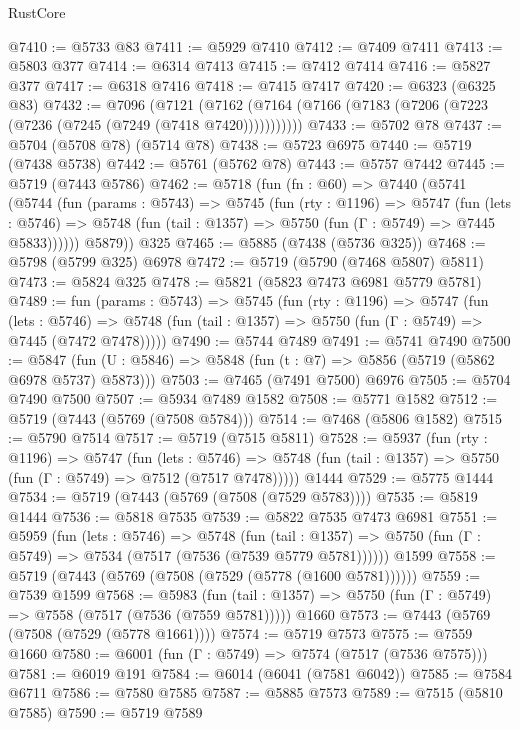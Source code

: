 \begin{lexlean}{RustCore}
\begin{coremodule}
@7410 := @5733 @83
@7411 := @5929 @7410
@7412 := @7409 @7411
@7413 := @5803 @377
@7414 := @6314 @7413
@7415 := @7412 @7414
@7416 := @5827 @377
@7417 := @6318 @7416
@7418 := @7415 @7417
@7420 := @6323 (@6325 @83)
@7432 := @7096
    (@7121 (@7162 (@7164 (@7166 (@7183 (@7206 (@7223 (@7236 (@7245 (@7249 (@7418 @7420)))))))))))
@7433 := @5702 @78
@7437 := @5704 (@5708 @78) (@5714 @78)
@7438 := @5723 @6975
@7440 := @5719 (@7438 @5738)
@7442 := @5761 (@5762 @78)
@7443 := @5757 @7442
@7445 := @5719 (@7443 @5786)
@7462 := @5718
    (fun (fn : @60) =>
    @7440
      (@5741
        (@5744
          (fun (params : @5743) =>
          @5745
            (fun (rty : @1196) =>
            @5747
              (fun (lets : @5746) =>
              @5748 (fun (tail : @1357) => @5750 (fun (Γ : @5749) => @7445 @5833))))))
        @5879))
    @325
@7465 := @5885 (@7438 (@5736 @325))
@7468 := @5798 (@5799 @325) @6978
@7472 := @5719 (@5790 (@7468 @5807) @5811)
@7473 := @5824 @325
@7478 := @5821 (@5823 @7473 @6981 @5779 @5781)
@7489 := fun (params : @5743) =>
  @5745
    (fun (rty : @1196) =>
    @5747
      (fun (lets : @5746) =>
      @5748 (fun (tail : @1357) => @5750 (fun (Γ : @5749) => @7445 (@7472 @7478)))))
@7490 := @5744 @7489
@7491 := @5741 @7490
@7500 := @5847 (fun (U : @5846) => @5848 (fun (t : @7) => @5856 (@5719 (@5862 @6978 @5737) @5873)))
@7503 := @7465 (@7491 @7500) @6976
@7505 := @5704 @7490 @7500
@7507 := @5934 @7489 @1582
@7508 := @5771 @1582
@7512 := @5719 (@7443 (@5769 (@7508 @5784)))
@7514 := @7468 (@5806 @1582)
@7515 := @5790 @7514
@7517 := @5719 (@7515 @5811)
@7528 := @5937
    (fun (rty : @1196) =>
    @5747
      (fun (lets : @5746) =>
      @5748 (fun (tail : @1357) => @5750 (fun (Γ : @5749) => @7512 (@7517 @7478)))))
    @1444
@7529 := @5775 @1444
@7534 := @5719 (@7443 (@5769 (@7508 (@7529 @5783))))
@7535 := @5819 @1444
@7536 := @5818 @7535
@7539 := @5822 @7535 @7473 @6981
@7551 := @5959
    (fun (lets : @5746) =>
    @5748
      (fun (tail : @1357) => @5750 (fun (Γ : @5749) => @7534 (@7517 (@7536 (@7539 @5779 @5781))))))
    @1599
@7558 := @5719 (@7443 (@5769 (@7508 (@7529 (@5778 (@1600 @5781))))))
@7559 := @7539 @1599
@7568 := @5983
    (fun (tail : @1357) => @5750 (fun (Γ : @5749) => @7558 (@7517 (@7536 (@7559 @5781)))))
    @1660
@7573 := @7443 (@5769 (@7508 (@7529 (@5778 @1661))))
@7574 := @5719 @7573
@7575 := @7559 @1660
@7580 := @6001 (fun (Γ : @5749) => @7574 (@7517 (@7536 @7575)))
@7581 := @6019 @191
@7584 := @6014 (@6041 (@7581 @6042))
@7585 := @7584 @6711
@7586 := @7580 @7585
@7587 := @5885 @7573
@7589 := @7515 (@5810 @7585)
@7590 := @5719 @7589

\end{coremodule}
\end{lexlean}
